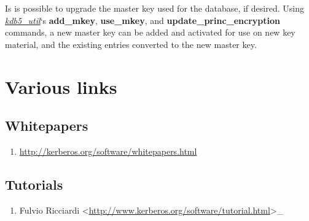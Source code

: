 \documentclass[letterpaper,10pt,english]{sphinxmanual}
\begin{document}
Is is possible to upgrade the master key used for the database, if
desired.  Using {\hyperref[admin/admin_commands/kdb5_util:kdb5-util-8]{\emph{kdb5\_util}}}`s \textbf{add\_mkey}, \textbf{use\_mkey}, and
\textbf{update\_princ\_encryption} commands, a new master key can be added
and activated for use on new key material, and the existing entries
converted to the new master key.


\chapter{Various links}
\label{admin/various_envs:various-links}\label{admin/various_envs::doc}

\section{Whitepapers}
\label{admin/various_envs:whitepapers}\begin{enumerate}
\item {} 
\href{http://kerberos.org/software/whitepapers.html}{http://kerberos.org/software/whitepapers.html}

\end{enumerate}


\section{Tutorials}
\label{admin/various_envs:tutorials}\begin{enumerate}
\item {} 
Fulvio Ricciardi  \textless{}\href{http://www.kerberos.org/software/tutorial.html}{http://www.kerberos.org/software/tutorial.html}\textgreater{}\_

\end{enumerate}
\end{document}
